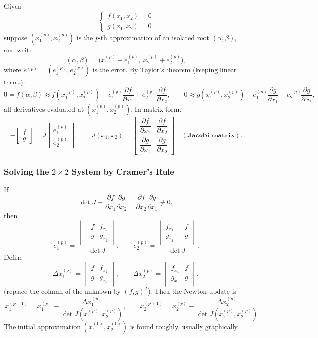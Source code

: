 \documentclass[hidelinks]{article}
\begin{document}
Given
\[
\begin{cases}f(x_1,x_2)=0\\ g(x_1,x_2)=0\end{cases}
\]
suppose $(x_1^{(p)},x_2^{(p)})$ is the $p$-th approximation of an isolated root $(\alpha,\beta)$, and write
\[
(\alpha,\beta)=\big(x_1^{(p)}+e_1^{(p)},\ x_2^{(p)}+e_2^{(p)}\big),
\]
where $e^{(p)}=(e_1^{(p)},e_2^{(p)})$ is the error. By Taylor's theorem (keeping linear terms):
\[
0=f(\alpha,\beta)\approx f(x_1^{(p)},x_2^{(p)})+e_1^{(p)}\frac{\partial f}{\partial x_1}+e_2^{(p)}\frac{\partial f}{\partial x_2},\qquad
0\approx g(x_1^{(p)},x_2^{(p)})+e_1^{(p)}\frac{\partial g}{\partial x_1}+e_2^{(p)}\frac{\partial g}{\partial x_2},
\]
all derivatives evaluated at $(x_1^{(p)},x_2^{(p)})$. In matrix form:
\[
-\begin{bmatrix}f\\ g\end{bmatrix}=J\begin{bmatrix}e_1^{(p)}\\ e_2^{(p)}\end{bmatrix},\qquad
J(x_1,x_2)=\begin{bmatrix}\dfrac{\partial f}{\partial x_1}&\dfrac{\partial f}{\partial x_2}\\[8pt]\dfrac{\partial g}{\partial x_1}&\dfrac{\partial g}{\partial x_2}\end{bmatrix}
\quad(\textbf{Jacobi matrix}).
\]

\subsubsection{Solving the $2\times2$ System by Cramer's Rule}

If
\[
\det J=\frac{\partial f}{\partial x_1}\frac{\partial g}{\partial x_2}-\frac{\partial f}{\partial x_2}\frac{\partial g}{\partial x_1}\neq0,
\]
then
\[
e_1^{(p)}=\frac{\begin{vmatrix}-f&f_{x_2}\\-g&g_{x_2}\end{vmatrix}}{\det J},\qquad
e_2^{(p)}=\frac{\begin{vmatrix}f_{x_1}&-f\\g_{x_1}&-g\end{vmatrix}}{\det J}.
\]
Define
\[
\Delta x_1^{(p)}=\begin{vmatrix}f&f_{x_2}\\ g&g_{x_2}\end{vmatrix},\qquad
\Delta x_2^{(p)}=\begin{vmatrix}f_{x_1}&f\\ g_{x_1}&g\end{vmatrix},
\]
(replace the column of the unknown by $(f,g)^T$). Then the Newton update is
\[
\boxed{\,x_1^{(p+1)}=x_1^{(p)}-\frac{\Delta x_1^{(p)}}{\det J(x_1^{(p)},x_2^{(p)})},\qquad
x_2^{(p+1)}=x_2^{(p)}-\frac{\Delta x_2^{(p)}}{\det J(x_1^{(p)},x_2^{(p)})}\,}
\]
The initial approximation $(x_1^{(0)},x_2^{(0)})$ is found roughly, usually graphically.
\end{document}
